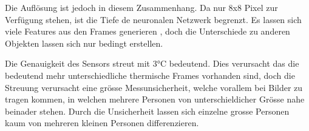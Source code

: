 Die Auflösung ist jedoch in diesem Zusammenhang. Da nur 8x8 Pixel zur Verfügung stehen, ist die Tiefe de neuronalen Netzwerk begrenzt. Es lassen sich viele Features aus den Frames generieren , doch die Unterschiede zu anderen Objekten lassen sich nur bedingt erstellen.

Die Genauigkeit des Sensors streut mit 3°C bedeutend. Dies verursacht das die bedeutend mehr unterschiedliche thermische Frames vorhanden sind, doch die Streuung verursacht eine grösse Messunsicherheit, welche vorallem bei Bilder zu tragen kommen, in welchen mehrere Personen von unterschieldicher Grösse nahe beinader stehen. Durch die Unsicherheit lassen sich einzelne grosse Personen kaum von mehreren kleinen Personen differenzieren.






